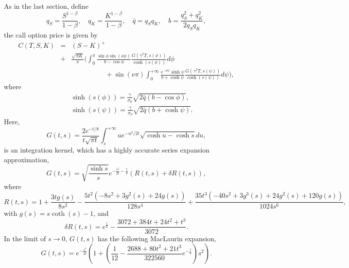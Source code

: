 \documentclass[12pt]{article}
\begin{document}
    As in the last section, define
    \begin{equation}
      q_S=\frac{S^{1-\beta}}{1-\beta}, \quad q_K=\frac{K^{1-\beta}}{1-\beta},
      \quad \bar{q}=q_Sq_K, \quad b=\frac{q_S^2+q_K^2}{2q_Sq_K},
    \end{equation}
    the call option price is given by
    \begin{eqnarray}
      C(T,S,K) &=& (S-K)^+ \nonumber\\
               &+&\frac{\sqrt{SK}}{\pi}\Bigg(\int_0^{\pi}\frac{\sin\phi\sin(\nu\phi)}{b-\cos\phi}
                          \frac{G(\gamma^2T,s(\phi))}{\cosh\left(s(\phi)\right)}d\phi\nonumber\\
               &&\quad\quad\quad\quad\quad + \sin(\nu\pi)\int_0^{+\infty}\frac{e^{-\nu \psi}\sinh \psi}{b+\cosh \psi}
         \frac{G(\gamma^2T,s(\psi))}{\cosh\left(s(\psi)\right)}d\psi\Bigg),
      \label{SABRZC}
    \end{eqnarray}
    where
    \begin{eqnarray}
      && \sinh\left(s(\phi)\right) =\frac{\gamma}{\sigma_0}\sqrt{2\bar{q}(b-\cos\phi)}, \nonumber\\
      && \sinh\left(s(\psi)\right) =\frac{\gamma}{\sigma_0}\sqrt{2\bar{q}(b+\cosh\psi)}.
    \end{eqnarray}
    Here,
    \begin{equation}
      G(t,s)=\frac{2e^{-t/8}}{t\sqrt{\pi t}}\int_s^{+\infty}ue^{-u^2/2t}\sqrt{\cosh u - \cosh s}du,
    \end{equation}
    is an integration kernel, which has a highly accurate series expansion approximation,
    \begin{equation}
      G(t,s)=\sqrt{\frac{\sinh s}{s}}e^{-\frac{s^2}{2t}-\frac{t}{8}}\left(R(t,s)+\delta R(t,s)\right),
    \end{equation}
    where
    \begin{equation}
      R(t,s)=1+\frac{3tg(s)}{8s^2}-\frac{5t^2(-8s^2+3g^2(s)+24g(s))}{128s^4}
              +\frac{35t^3(-40s^2+3g^3(s)+24g^2(s)+120g(s))}{1024s^6},
    \end{equation}
    with $g(s)=s\coth(s)-1$, and
    \begin{equation}
      \delta R(t,s)=e^{\frac{t}{8}}-\frac{3072+384t+24t^2+t^3}{3072}.
    \end{equation}
    In the limit of $s\rightarrow 0$, $G(t,s)$ has the following MacLaurin expansion,
    \begin{equation}
      G(t,s)=e^{-\frac{s^2}{2t}}\left(1+\left(\frac{1}{12}-\frac{2688+80t^2+21t^3}{322560}e^{-\frac{t}{8}}\right)s^2\right).
    \end{equation}
\end{document}
